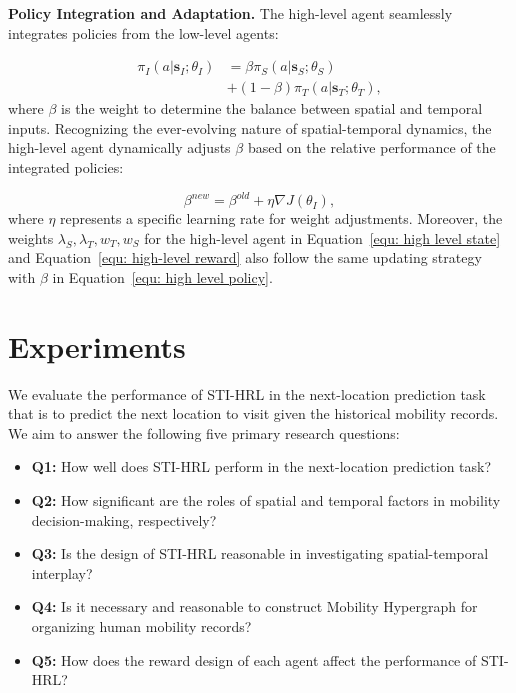 \documentclass[letterpaper]{article} %
\begin{document}
\noindent \textbf{Policy Integration and Adaptation.} The high-level agent seamlessly integrates policies from the low-level agents:

\begin{align}
 \pi_{I}(a|\mathbf{s}_{I};\theta_{I}) &= \beta \pi_S(a|\mathbf{s}_S;\theta_S) \nonumber \\
 &+ (1-\beta) \pi_T(a|\mathbf{s}_T; \theta_T),
\end{align}
where $ \beta $ is the weight to determine the balance between spatial and temporal inputs. Recognizing the ever-evolving nature of spatial-temporal dynamics, the high-level agent dynamically adjusts $ \beta $ based on the relative performance of the integrated policies:


\begin{equation}
    \beta^{new} = \beta^{old} + \eta \nabla J(\theta_{I}),
    \label{equ: high level policy}
\end{equation}
where $ \eta $ represents a specific learning rate for weight adjustments. 
Moreover, the weights $\lambda_S, \lambda_T, w_T, w_S$ for the high-level agent in Equation~\ref{equ: high level state} and Equation~\ref{equ: high-level reward} also follow the same updating strategy with $\beta$ in Equation~\ref{equ: high level policy}.


\section{Experiments}
We evaluate the performance of STI-HRL in the next-location prediction task that is to predict the next location to visit given the historical mobility records. 
We aim to answer the following five primary research questions:

\begin{itemize}
    \item \textbf{Q1:} How well does STI-HRL perform in the next-location prediction task?
    \item \textbf{Q2:} How significant are the roles of spatial and temporal factors in mobility decision-making, respectively? 
    \item \textbf{Q3:} Is the design of STI-HRL reasonable in investigating spatial-temporal interplay? 
    \item \textbf{Q4:} Is it necessary and reasonable to construct Mobility Hypergraph for organizing human mobility records?
    \item \textbf{Q5:} How does the reward design  of each agent affect the performance of STI-HRL? 
\end{itemize}
\end{document}
